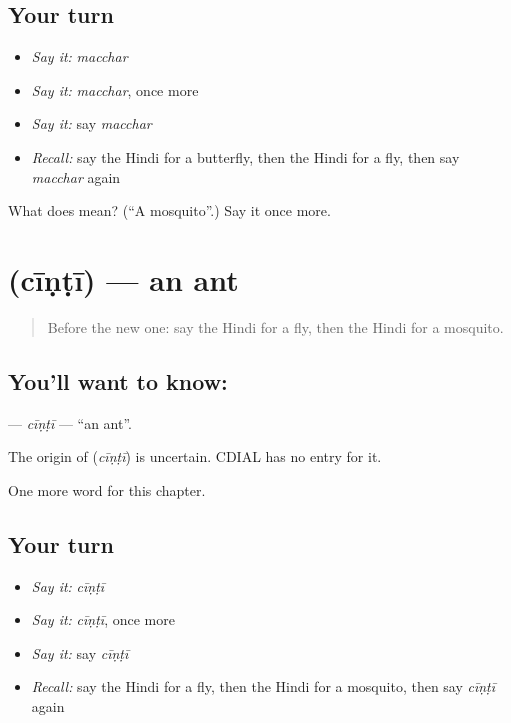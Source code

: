 \subsection*{Your turn}
\begin{itemize}
\raggedright
  \item \emph{Say it:} \emph{macchar}
  \item \emph{Say it:} \emph{macchar}, once more
  \item \emph{Say it:} say \emph{macchar}
  \item \emph{Recall:} say the Hindi for a butterfly, then the Hindi for a fly, then say \emph{macchar} again
\end{itemize}

\begin{tcolorbox}[breakable,colback=teal!4,colframe=teal!35!black,title={Before you move on}]
What does  mean? (\textquotedblleft{}A mosquito\textquotedblright{}.) Say it once more.
\end{tcolorbox}
\section[\texorpdfstring{\hi{चींटी} (cīṇṭī)}{चींटी (cīṇṭī)}]{ (cīṇṭī) — an ant}

\label{lesson:HI-C149-cinti}



\begin{quote}
Before the new one: say the Hindi for a fly, then the Hindi for a mosquito.
\end{quote}

\subsection*{You'll want to know: }
\textbf{} — \emph{cīṇṭī} — \textquotedblleft{}an ant\textquotedblright{}.

\begin{cousinweb}
The origin of \textbf{} (\emph{cīṇṭī}) is uncertain. CDIAL has no entry for it.
\end{cousinweb}

\begin{grammarlens}[title={What you've built}]
One more word for this chapter.
\end{grammarlens}

\subsection*{Your turn}
\begin{itemize}
\raggedright
  \item \emph{Say it:} \emph{cīṇṭī}
  \item \emph{Say it:} \emph{cīṇṭī}, once more
  \item \emph{Say it:} say \emph{cīṇṭī}
  \item \emph{Recall:} say the Hindi for a fly, then the Hindi for a mosquito, then say \emph{cīṇṭī} again
\end{itemize}

